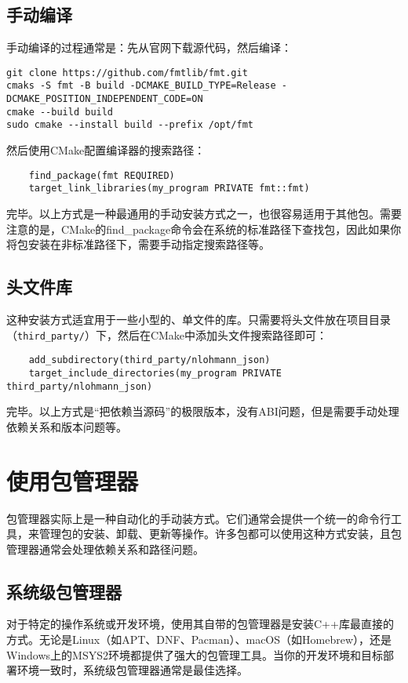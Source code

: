 \documentclass[../main]{subfiles}
\begin{document}
\subsection{手动编译}

手动编译的过程通常是：先从官网下载源代码，然后编译：
\begin{lstlisting}
git clone https://github.com/fmtlib/fmt.git
cmaks -S fmt -B build -DCMAKE_BUILD_TYPE=Release -DCMAKE_POSITION_INDEPENDENT_CODE=ON
cmake --build build
sudo cmake --install build --prefix /opt/fmt
\end{lstlisting}

然后使用CMake配置编译器的搜索路径：
\begin{lstlisting}
    find_package(fmt REQUIRED)
    target_link_libraries(my_program PRIVATE fmt::fmt)
\end{lstlisting}

完毕。以上方式是一种最通用的手动安装方式之一，也很容易适用于其他包。需要注意的是，CMake的find\_package命令会在系统的标准路径下查找包，因此如果你将包安装在非标准路径下，需要手动指定搜索路径等。

\subsection{头文件库}

这种安装方式适宜用于一些小型的、单文件的库。只需要将头文件放在项目目录（\texttt{third\_party/}）下，然后在CMake中添加头文件搜索路径即可：
\begin{lstlisting}
    add_subdirectory(third_party/nlohmann_json)
    target_include_directories(my_program PRIVATE third_party/nlohmann_json)
\end{lstlisting}

完毕。以上方式是“把依赖当源码”的极限版本，没有ABI问题，但是需要手动处理依赖关系和版本问题等。

\section{使用包管理器}

包管理器实际上是一种自动化的手动装方式。它们通常会提供一个统一的命令行工具，来管理包的安装、卸载、更新等操作。许多包都可以使用这种方式安装，且包管理器通常会处理依赖关系和路径问题。

\subsection{系统级包管理器}

对于特定的操作系统或开发环境，使用其自带的包管理器是安装C++库最直接的方式。无论是Linux（如APT、DNF、Pacman）、macOS（如Homebrew），还是 Windows上的MSYS2环境都提供了强大的包管理工具。当你的开发环境和目标部署环境一致时，系统级包管理器通常是最佳选择。
\end{document}
